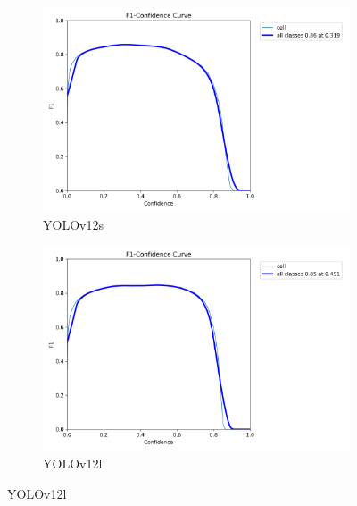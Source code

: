 \documentclass[12pt,a4paper,onecolumn,oneside]{report}
\begin{document}
\begin{figure}[H]
  \vspace{0.0cm}
  \begin{subfigure}[b]{0.48\textwidth}
    \centering
    \includegraphics[width=\textwidth]{figuras/resultados experimentacion/yolov12s/original_test/BoxF1_curve.png}
    \caption{YOLOv12s}
    \label{fig:yolov12s_original_test}
  \end{subfigure}
  \hfill
  \begin{subfigure}[b]{0.48\textwidth}
    \centering
    \includegraphics[width=\textwidth]{figuras/resultados experimentacion/yolov12l/original_test/BoxF1_curve.png}
    \caption{YOLOv12l}
    \label{fig:yolov12l_original_test}
  \end{subfigure}
  

\end{figure}
\end{document}
